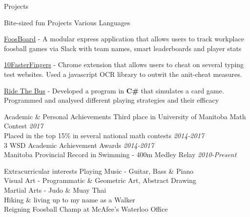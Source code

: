 \documentclass{resume} %
\newcommand{\award}[2]{#1 \hfill {\em #2}}
\begin{document}
\begin{rSection}{Projects}
    \vspace{1em}

    \begin{sideproject}
        {Bite-sized fun Projects}
        {Various Languages}
        {}
        {
            \item {\href{https://github.com/wbhildeb/FoosBoard}{\faGithub{} FoosBoard}} - A modular express application that allows users to track workplace foosball games via Slack with team names, smart leaderboards and player stats
            \item {\href{https://github.com/wbhildeb/Ten-Faster-Fingers}{\faGithub{} 10FasterFingers}} - Chrome extension that allows users to cheat on several typing test websites. Used a javascript OCR library to outwit the anit-cheat measures.
            \item {\href{https://github.com/wbhildeb/Ride-The-Bus}{\faGithub{} Ride The Bus}} - Developed a program in \textbf{C\#} that simulates a card game. Programmed and analysed different playing strategies and their efficacy
        }
    \end{sideproject}



\end{rSection}


\begin{rSection}{Academic \& Personal Achievements}
    \award{Third place in University of Manitoba Math Contest}{2017} \\
    \award{Placed in the top 15\% in several national math contests}{2014-2017} \\
    \award{3 WSD Academic Achievement Awards}{2014-2017}\\
    \award{Manitoba Provincial Record in Swimming - 400m Medley Relay}{2010-Present}\\
\end{rSection}


\begin{rSection}{Extracurricular interests}
    \award{Playing Music - Guitar, Bass \& Piano}{ }\\
    \award{Visual Art - Programmatic \& Geometric Art, Abstract Drawing}{ }\\
    \award{Martial Arts - Judo \& Muay Thai}{ }\\
    \award{Hiking \& living up to my name as a Walker}{ }\\
    \award{Reigning Foosball Champ at McAfee's Waterloo Office}{ }\\
\end{rSection}
    
\end{document}
